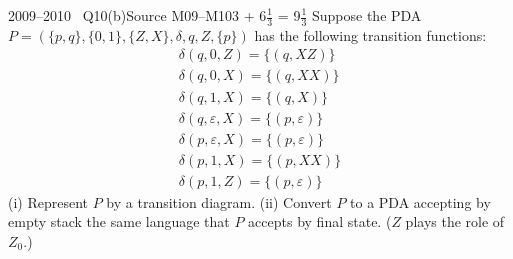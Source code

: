 \documentclass[11pt,a4paper]{article}
\newcommand{\eps}{\varepsilon}
\begin{document}
\begin{question}{2009--2010 \textbullet\ Q10(b)}{Source M09--M10}{3 + 6$\tfrac13$ = 9$\tfrac13$}
Suppose the PDA $P=(\{p,q\},\{0,1\},\{Z,X\},\delta,q,Z,\{p\})$ has the following transition functions:
\[\begin{array}{l}
\delta(q,0,Z)=\{(q,XZ)\}\\
\delta(q,0,X)=\{(q,XX)\}\\
\delta(q,1,X)=\{(q,X)\}\\
\delta(q,\eps,X)=\{(p,\eps)\}\\
\delta(p,\eps,X)=\{(p,\eps)\}\\
\delta(p,1,X)=\{(p,XX)\}\\
\delta(p,1,Z)=\{(p,\eps)\}
\end{array}\]
(i) Represent $P$ by a transition diagram. (ii) Convert $P$ to a PDA accepting by empty stack the same language that $P$ accepts by final state. ($Z$ plays the role of $Z_0$.)
\end{question}
\end{document}
